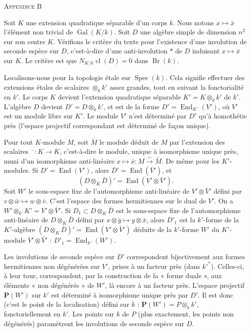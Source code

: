 \documentclass[10pt,a4paper]{article}
\DeclareMathOperator{\Gal}{Gal}
\DeclareMathOperator{\End}{End}
\DeclareMathOperator{\Br}{Br}
\DeclareMathOperator{\Spec}{Spec}
\DeclareMathOperator{\cl}{cl}
\newcommand{\AppendixHeading}[1]{\par\vspace{1.2em}\begin{center}\textsc{Appendice #1}\end{center}\vspace{0.6em}\par}
\begin{document}
\newpage
\AppendixHeading{B}
Soit $K$ une extension quadratique séparable d'un corps $k$. Nous notons $x\mapsto\bar{x}$
l'élément non trivial de $\Gal(K/k)$. Soit $D$ une algèbre simple de dimension
$n^2$ sur son centre $K$. Vérifions le critère du texte pour l'existence
d'une involution de seconde espèce sur $D$, c'est-à-dire d'une anti-involution $*$ de $D$
induisant $x\mapsto\bar{x}$ sur $K$. Le critère est que $N_{K/k}\cl(D)=0$ dans $\Br(k)$.

Localisons-nous pour la topologie étale sur $\Spec(k)$. Cela signifie effectuer
des extensions étales de scalaires $\otimes_k k'$ assez grandes, tout en suivant la
fonctorialité en $k'$. Le corps $K$ devient l'extension quadratique séparable
$K'=K\otimes_k k'$ de $k'$. L'algèbre $D$ devient $D'=D\otimes_k k'$, et est de la forme
$D'=\End_{K'}(V')$, où $V'$ est un module libre sur $K'$. Le module $V'$ n'est déterminé
par $D'$ qu'à homothétie près (l'espace projectif correspondant est déterminé de façon unique).

Pour tout $K$-module $M$, soit $\bar{M}$ le module déduit de $M$ par l'extension
des scalaires $\bar{\phantom{x}}:K\to K$, c'est-à-dire le module, unique à isomorphisme unique près,
muni d'un isomorphisme anti-linéaire $x\mapsto\bar{x}:M\xrightarrow{\sim}\bar{M}$.
De même pour les $K'$-modules. Si $D'=\End(V')$, alors $\bar{D}{}'=\End(\bar{V}{}')$, et
\[
(D\otimes_K\bar{D})'=\End(V'\otimes\bar{V}{}').
\]
Soit $W'$ le sous-espace fixe de l'automorphisme anti-linéaire de $V'\otimes\bar{V}{}'$
défini par $v\otimes\bar{w}\mapsto w\otimes\bar{v}$. C'est l'espace des formes hermitiennes sur le dual de
$V'$. On a $W'\otimes_{k'}K'=V'\otimes\bar{V}{}'$. Si $D_1\subset D\otimes_K\bar{D}$ est le sous-espace fixe
de l'automorphisme anti-linéaire de $D\otimes_K\bar{D}$ défini par $x\otimes\bar{y}\mapsto y\otimes\bar{x}$, alors
$D'_1$ est la $k'$-forme de la $K'$-algèbre $(D\otimes_K\bar{D})'=\End(V'\otimes\bar{V}{}')$ déduite de
la $k'$-forme $W'$ du $K'$-module $V'\otimes\bar{V}{}'$ : $D'_1=\End_{k'}(W')$.

Les involutions de seconde espèce sur $D'$ correspondent bijectivement aux formes
hermitiennes non dégénérées sur $V'$, prises à un facteur près (dans $k'^*$). Celles-ci, à leur tour,
correspondent, par la construction de la « forme duale », aux éléments « non dégénérés » de
$W'$, là encore à un facteur près. L'espace projectif $\mathbf{P}(W')$ sur $k'$ est déterminé
à isomorphisme unique près par $D'$. Il est donc (c'est le point de la localisation) défini sur $k$ :
$\mathbf{P}(W')=P\otimes_k k'$, fonctoriellement en $k'$. Les points sur $k$ de $P$ (plus exactement,
les points non dégénérés) paramètrent les involutions de seconde espèce sur $D$.
\end{document}
